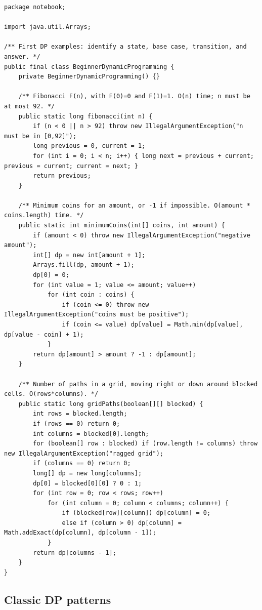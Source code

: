 \documentclass[10pt,letterpaper]{article}
\begin{document}
\begin{lstlisting}
package notebook;

import java.util.Arrays;

/** First DP examples: identify a state, base case, transition, and answer. */
public final class BeginnerDynamicProgramming {
    private BeginnerDynamicProgramming() {}

    /** Fibonacci F(n), with F(0)=0 and F(1)=1. O(n) time; n must be at most 92. */
    public static long fibonacci(int n) {
        if (n < 0 || n > 92) throw new IllegalArgumentException("n must be in [0,92]");
        long previous = 0, current = 1;
        for (int i = 0; i < n; i++) { long next = previous + current; previous = current; current = next; }
        return previous;
    }

    /** Minimum coins for an amount, or -1 if impossible. O(amount * coins.length) time. */
    public static int minimumCoins(int[] coins, int amount) {
        if (amount < 0) throw new IllegalArgumentException("negative amount");
        int[] dp = new int[amount + 1];
        Arrays.fill(dp, amount + 1);
        dp[0] = 0;
        for (int value = 1; value <= amount; value++)
            for (int coin : coins) {
                if (coin <= 0) throw new IllegalArgumentException("coins must be positive");
                if (coin <= value) dp[value] = Math.min(dp[value], dp[value - coin] + 1);
            }
        return dp[amount] > amount ? -1 : dp[amount];
    }

    /** Number of paths in a grid, moving right or down around blocked cells. O(rows*columns). */
    public static long gridPaths(boolean[][] blocked) {
        int rows = blocked.length;
        if (rows == 0) return 0;
        int columns = blocked[0].length;
        for (boolean[] row : blocked) if (row.length != columns) throw new IllegalArgumentException("ragged grid");
        if (columns == 0) return 0;
        long[] dp = new long[columns];
        dp[0] = blocked[0][0] ? 0 : 1;
        for (int row = 0; row < rows; row++)
            for (int column = 0; column < columns; column++) {
                if (blocked[row][column]) dp[column] = 0;
                else if (column > 0) dp[column] = Math.addExact(dp[column], dp[column - 1]);
            }
        return dp[columns - 1];
    }
}
\end{lstlisting}
\subsection{Classic DP patterns}
\end{document}
